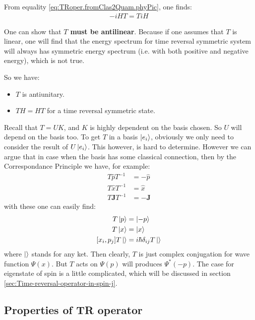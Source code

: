 \documentclass{article}
\numberwithin{equation}{subsection} %
\theoremstyle{definition}
\begin{document}
    From equality \ref{eq:TRoper.fromClas2Quam.phyPic}, one finds:
    \begin{align}
        -iHT = T i H
    \end{align}

    One can show that \textbf{$T$ must be antilinear}. Because if one
    assumes that $T$ is linear, one will find that the energy
    spectrum for time reversal symmetric system will always has symmetric
    energy spectrum (i.e. with both positive and negative
    energy), which is not true.

    So we have:
    \begin{itemize}
        \item $T$ is antiunitary.
        \item $T H=HT$ for a time reversal symmetric state.
    \end{itemize}
    
    Recall that $T= UK$, and $K$ is highly dependent on the basis
    chosen. So $U$ will depend on the basis too. To get $T$ in a
    basis $\ket{e_i}$, obviously we only need to consider the result of
    $U\ket{e_i}$. This however, is hard to determine. However we can argue
    that in case when the basis has some classical connection, then by the
    Correspondance Principle we have, for example:
    \begin{align}
        T \hat{p} T^{-1}&= -\hat{p} \\
        T \hat{x} T^{-1}&= \hat{x} \\
        T \mathbf{J} T^{-1}&= -\mathbf{J}
    \end{align}
    with these one can easily find:
    \begin{align}
        T \ket{p} &= \ket{-p} \\
        T \ket{x} &= \ket{x} \\
        [x_i, p_j]T \ket{} &= i\hbar \delta_{ij} T\ket{}
    \end{align}
    where $\ket{}$ stands for any ket. Then clearly, $T$ is just
    complex conjugation for wave function $\Psi(x)$. But $T$ acts on
    $\Psi(p)$ will produces $\Psi^*(-p)$. The case for eigenstate of
    spin is a little complicated, which will be discussed in section
    \ref{sec:Time-reversal-operator-in-spin-j}.

    \subsection{Properties of TR operator}
    \label{sec:Properties-of-TR-operator}
    
\end{document}
